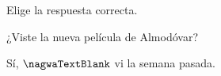 
\begin{question}

\begin{instance}
  
\begin{mcq}[standalone=false]
    
\begin{stem}
      Elige la respuesta correcta.\par      
\begin{enumerationnolabel}
        \item{          ¿Viste la nueva película de Almodóvar?        }        \item{          Sí, $\nagwaTextBlank$ vi la semana pasada.        }      
\end{enumerationnolabel}
    
\end{stem}
    
\begin{distractors}
\end{distractors}
              
\end{mcq}

\end{instance}

\end{question}

